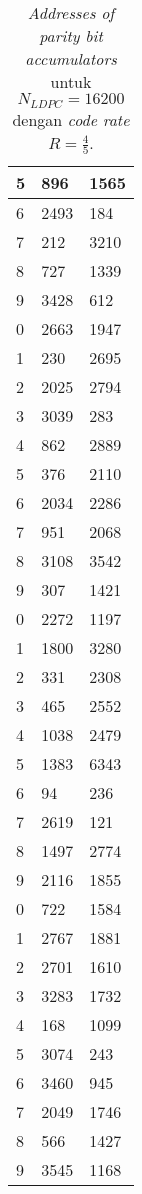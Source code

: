 \begin{table}[tb]
	\centering
	\caption{\textit{Addresses of parity bit accumulators} untuk $N_{LDPC}=16200$ dengan \textit{code rate} $R=\frac{4}{5}$.}
	\label{table:rate2}
\begin{tabular}{|l|l|l|}
	\hline
	5 & 896  & 1565 \\ \hline
	6 & 2493 & 184  \\ \hline
	7 & 212  & 3210 \\ \hline
	8 & 727  & 1339 \\ \hline
	9 & 3428 & 612  \\ \hline
	0 & 2663 & 1947 \\ \hline
	1 & 230  & 2695 \\ \hline
	2 & 2025 & 2794 \\ \hline
	3 & 3039 & 283  \\ \hline
	4 & 862  & 2889 \\ \hline
	5 & 376  & 2110 \\ \hline
	6 & 2034 & 2286 \\ \hline
	7 & 951  & 2068 \\ \hline
	8 & 3108 & 3542 \\ \hline
	9 & 307  & 1421 \\ \hline
	0 & 2272 & 1197 \\ \hline
	1 & 1800 & 3280 \\ \hline
	2 & 331  & 2308 \\ \hline
	3 & 465  & 2552 \\ \hline
	4 & 1038 & 2479 \\ \hline
	5 & 1383 & 6343 \\ \hline
	6 & 94   & 236  \\ \hline
	7 & 2619 & 121  \\ \hline
	8 & 1497 & 2774 \\ \hline
	9 & 2116 & 1855 \\ \hline
	0 & 722  & 1584 \\ \hline
	1 & 2767 & 1881 \\ \hline
	2 & 2701 & 1610 \\ \hline
	3 & 3283 & 1732 \\ \hline
	4 & 168  & 1099 \\ \hline
	5 & 3074 & 243  \\ \hline
	6 & 3460 & 945  \\ \hline
	7 & 2049 & 1746 \\ \hline
	8 & 566  & 1427 \\ \hline
	9 & 3545 & 1168 \\ \hline
\end{tabular}
	
	
\end{table}

